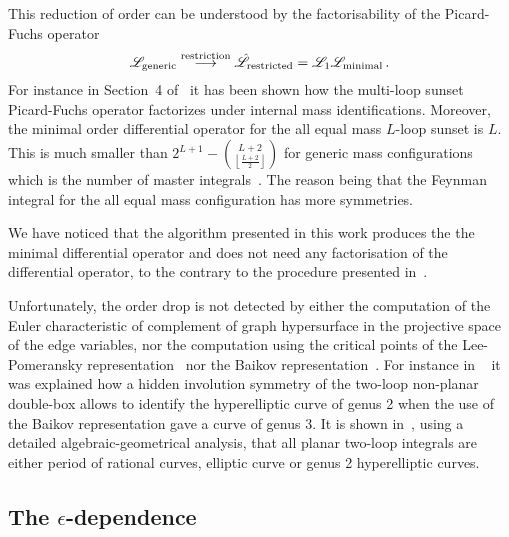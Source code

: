 \documentclass[a4paper,12pt]{article}
\newcommand\lNote[1]{
	\todo[backgroundcolor=red!20!white,fancyline,
	bordercolor=white]{ LDLC:  #1}}
\numberwithin{equation}{section}
\numberwithin{figure}{section}
\begin{document}
This reduction of order can be
understood by the factorisability of the Picard-Fuchs operator
\begin{equation}
  \mathscr{L}_{\rm generic} \stackrel{\rm restriction}{\longrightarrow}
  \hat{\mathscr{L}}_{\rm restricted}   = \mathscr{L}_1 \mathscr{L}_{\rm minimal} \,.
\end{equation}
For instance in Section~4 of~\cite{Lairez:2022zkj} it has been shown
how the multi-loop sunset Picard-Fuchs operator factorizes under
internal mass identifications. Moreover,
%
the minimal order differential operator for the all equal
mass $L$-loop sunset is $L$. This is much smaller than 
$2^{L+1}-\binom{L+2}{\left\lfloor \frac{L+2}{2}\right\rfloor }$ for generic
mass configurations~\cite{Lairez:2022zkj} which is the number of
master integrals~\cite{Bitoun:2017nre}.
The reason being that the Feynman integral for the all equal mass
configuration has more symmetries.  

We have noticed that the algorithm presented in this work produces the 
the minimal  differential operator and does not need any factorisation
of the differential operator, to the contrary to the procedure
presented in~\cite{Pogel:2022vat}. 
%
%

Unfortunately, the order drop is not detected by  either the
computation of the Euler characteristic of complement of graph
hypersurface in the projective space of the edge variables, nor the
computation using the critical points of the
Lee-Pomeransky representation~\cite{Lee:2013hzt}   nor the
Baikov
representation~\cite{Frellesvig:2017aai,Frellesvig:2019uqt,Cacciatori:2021nli}.
For instance in ~\cite{Marzucca:2023gto} it was explained how a hidden involution symmetry of the
two-loop non-planar double-box allows to identify the hyperelliptic
curve of genus 2 when the use of the Baikov representation gave a
curve of genus 3.
It is shown in~\cite{Doran:2023yzu}, using
a detailed  algebraic-geometrical analysis, that all planar two-loop
integrals are either period of rational curves, elliptic curve or genus
2 hyperelliptic curves. \lNote{also order drop?}

\subsection{The $\epsilon$-dependence}
\label{sec:epsilon-dependence}
\end{document}
